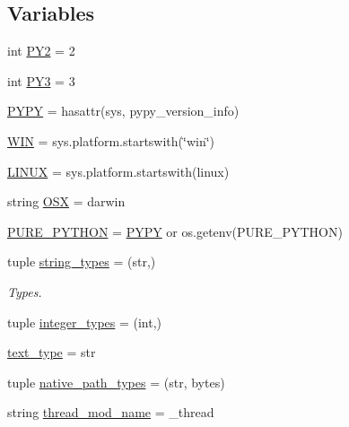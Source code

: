 \subsection*{Variables}
\begin{DoxyCompactItemize}
\item 
int \hyperlink{namespacegevent_1_1__compat_a4c797e14215a11782e89ac9d79319eef}{P\+Y2} = 2
\item 
int \hyperlink{namespacegevent_1_1__compat_a1f38bd9bcbba22fdec8ae256d328ebbd}{P\+Y3} = 3
\item 
\hyperlink{namespacegevent_1_1__compat_a1c5554c22e52f2b933b1f23af43c4fdb}{P\+Y\+PY} = hasattr(sys, \textquotesingle{}pypy\+\_\+version\+\_\+info\textquotesingle{})
\item 
\hyperlink{namespacegevent_1_1__compat_a887be9cbf2ddbbf113adcdec314f4438}{W\+IN} = sys.\+platform.\+startswith(\char`\"{}win\char`\"{})
\item 
\hyperlink{namespacegevent_1_1__compat_a40976c8a39be1eb8d1a09d0bf19d7cfe}{L\+I\+N\+UX} = sys.\+platform.\+startswith(\textquotesingle{}linux\textquotesingle{})
\item 
string \hyperlink{namespacegevent_1_1__compat_abc3311390157fd2ddfdb7c0ed4e15767}{O\+SX} = \textquotesingle{}darwin\textquotesingle{}
\item 
\hyperlink{namespacegevent_1_1__compat_ac9b543bba52d108734417c651f70f138}{P\+U\+R\+E\+\_\+\+P\+Y\+T\+H\+ON} = \hyperlink{namespacegevent_1_1__compat_a1c5554c22e52f2b933b1f23af43c4fdb}{P\+Y\+PY} or os.\+getenv(\textquotesingle{}P\+U\+R\+E\+\_\+\+P\+Y\+T\+H\+ON\textquotesingle{})
\item 
tuple \hyperlink{namespacegevent_1_1__compat_a2cec5c777b0096ac9a06a9b82f33b5b5}{string\+\_\+types} = (str,)
\begin{DoxyCompactList}\small\item\em Types. \end{DoxyCompactList}\item 
tuple \hyperlink{namespacegevent_1_1__compat_a187799adcbf897d7e24079b6c38deeba}{integer\+\_\+types} = (int,)
\item 
\hyperlink{namespacegevent_1_1__compat_a7264cc993b8f480e0fbd566e72f089f1}{text\+\_\+type} = str
\item 
tuple \hyperlink{namespacegevent_1_1__compat_a159360e096926e3ecba47ae9f7d62115}{native\+\_\+path\+\_\+types} = (str, bytes)
\item 
string \hyperlink{namespacegevent_1_1__compat_ac40cc83f74eb77f58053d1fe3b04ae66}{thread\+\_\+mod\+\_\+name} = \textquotesingle{}\+\_\+thread\textquotesingle{}

\end{DoxyCompactItemize}
